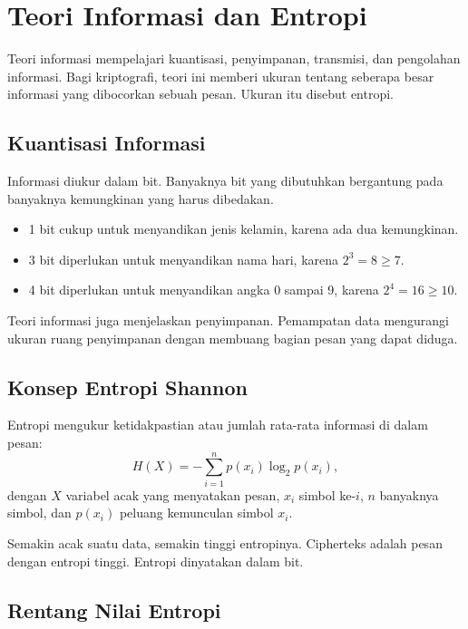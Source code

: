 \section{Teori Informasi dan Entropi}
\label{sec:teori-informasi}

Teori informasi mempelajari kuantisasi, penyimpanan, transmisi, dan pengolahan
informasi. Bagi kriptografi, teori ini memberi ukuran tentang seberapa besar
informasi yang dibocorkan sebuah pesan. Ukuran itu disebut entropi.

\subsection{Kuantisasi Informasi}

Informasi diukur dalam bit. Banyaknya bit yang dibutuhkan bergantung pada
banyaknya kemungkinan yang harus dibedakan.
\begin{itemize}
    \item 1 bit cukup untuk menyandikan jenis kelamin, karena ada dua kemungkinan.
    \item 3 bit diperlukan untuk menyandikan nama hari, karena $2^3 = 8 \ge 7$.
    \item 4 bit diperlukan untuk menyandikan angka 0 sampai 9, karena
          $2^4 = 16 \ge 10$.
\end{itemize}
Teori informasi juga menjelaskan penyimpanan. Pemampatan data mengurangi ukuran
ruang penyimpanan dengan membuang bagian pesan yang dapat diduga.

\subsection{Konsep Entropi Shannon}

Entropi mengukur ketidakpastian atau jumlah rata-rata informasi di dalam pesan:
\begin{equation}
    H(X) = -\sum_{i=1}^{n} p(x_i) \log_2 p(x_i),
    \label{eq:entropi}
\end{equation}
dengan $X$ variabel acak yang menyatakan pesan, $x_i$ simbol ke-$i$, $n$
banyaknya simbol, dan $p(x_i)$ peluang kemunculan simbol $x_i$.

Semakin acak suatu data, semakin tinggi entropinya. Cipherteks adalah pesan
dengan entropi tinggi. Entropi dinyatakan dalam bit.

\subsection{Rentang Nilai Entropi}

